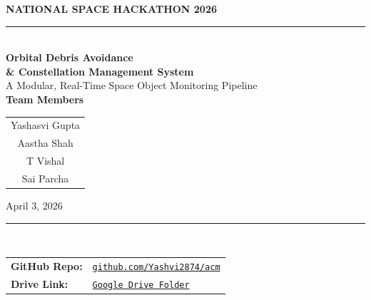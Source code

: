 \documentclass[11pt, a4paper]{article}
\begin{document}
\begin{titlepage}
  \pagecolor{spaceblue}
  \color{white}
  \centering
  \vspace*{2cm}

  {\fontsize{11}{14}\selectfont\color{accentgold}\textbf{NATIONAL SPACE HACKATHON 2026}}\\[0.4cm]
  {\color{orbitcyan}\rule{0.6\linewidth}{1.5pt}}\\[1.0cm]

  {\fontsize{24}{30}\selectfont\bfseries Orbital Debris Avoidance}\\[0.3cm]
  {\fontsize{24}{30}\selectfont\bfseries \& Constellation Management System}\\[1.2cm]

  {\color{stargray}\large A Modular, Real-Time Space Object Monitoring Pipeline}\\[2.5cm]

  {\color{accentgold}\large\bfseries Team Members}\\[0.4cm]
  \begin{tabular}{c}
    {\large Yashasvi Gupta} \\[4pt]
    {\large Aastha Shah} \\[4pt]
    {\large T Vishal} \\[4pt]
    {\large Sai Parcha} \\
  \end{tabular}

  \vfill

  {\color{stargray} April 3, 2026}\\[0.3cm]
  {\color{orbitcyan}\rule{0.4\linewidth}{0.8pt}}\\[0.4cm]

  \begin{tabular}{ll}
    \color{stargray}\textbf{GitHub Repo:} &
      \href{https://github.com/Yashvi2874/acm}{\color{orbitcyan}\texttt{github.com/Yashvi2874/acm}} \\[4pt]
    \color{stargray}\textbf{Drive Link:} &
      \href{https://drive.google.com/drive/folders/1weXqaLgwXBDuzULpHXSRx9SagEeRGceT}
           {\color{orbitcyan}\texttt{Google Drive Folder}} \\
  \end{tabular}

\end{titlepage}
\nopagecolor
\end{document}
